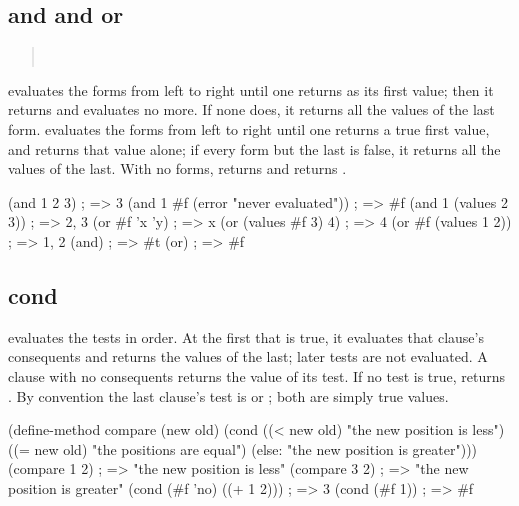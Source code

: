 \subsection{and and or}

\begin{quote}
\\
\end{quote}

\noindent {} evaluates the forms from left to right until one
returns  as its first value; then it returns  and
evaluates no more. If none does, it returns all the values of the last
form.  evaluates the forms from left to right until one returns a
true first value, and returns that value alone; if every form but the last
is false, it returns all the values of the last. With no forms, 
returns  and  returns .

\begin{dylan}
(and 1 2 3)              ; => 3
(and 1 #f (error "never evaluated"))   ; => #f
(and 1 (values 2 3))     ; => 2, 3
(or #f 'x 'y)            ; => x
(or (values #f 3) 4)     ; => 4
(or #f (values 1 2))     ; => 1, 2
(and)                    ; => #t
(or)                     ; => #f
\end{dylan}

\subsection{cond}

\begin{quote}
\end{quote}

\noindent {} evaluates the tests in order. At the first that is
true, it evaluates that clause's consequents and returns the values of the
last; later tests are not evaluated. A clause with no consequents returns
the value of its test. If no test is true,  returns .
By convention the last clause's test is  or ; both are
simply true values.

\begin{dylan}
(define-method compare (new old)
  (cond ((< new old) "the new position is less")
        ((= new old) "the positions are equal")
        (else: "the new position is greater")))
(compare 1 2)            ; => "the new position is less"
(compare 3 2)            ; => "the new position is greater"
(cond (#f 'no) ((+ 1 2)))     ; => 3
(cond (#f 1))            ; => #f
\end{dylan}

